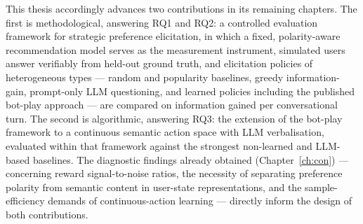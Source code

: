 This thesis accordingly advances two contributions in its remaining chapters. The first is methodological, answering RQ1 and RQ2: a controlled evaluation framework for strategic preference elicitation, in which a fixed, polarity-aware recommendation model serves as the measurement instrument, simulated users answer verifiably from held-out ground truth, and elicitation policies of heterogeneous types — random and popularity baselines, greedy information-gain, prompt-only LLM questioning, and learned policies including the published bot-play approach \citep{makarova2024learning} — are compared on information gained per conversational turn. The second is algorithmic, answering RQ3: the extension of the bot-play framework to a continuous semantic action space with LLM verbalisation, evaluated within that framework against the strongest non-learned and LLM-based baselines. The diagnostic findings already obtained (Chapter~\ref{ch:con}) — concerning reward signal-to-noise ratios, the necessity of separating preference polarity from semantic content in user-state representations, and the sample-efficiency demands of continuous-action learning — directly inform the design of both contributions.
